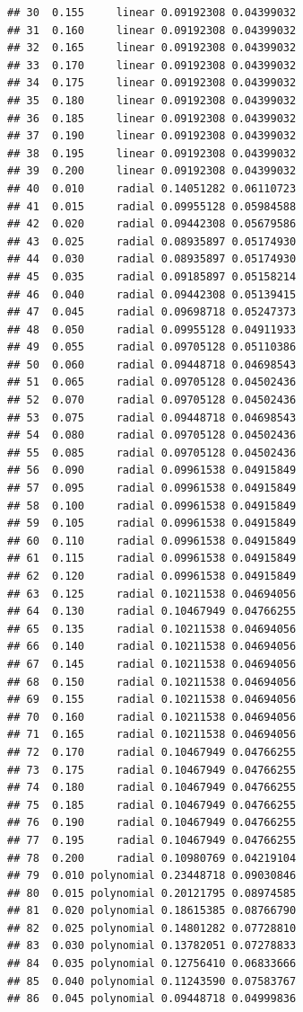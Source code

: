 \documentclass[12pt,fleqn]{article}\usepackage[]{graphicx}\usepackage[]{color}
\makeatletter
\newenvironment{kframe}{%
 \def\at@end@of@kframe{}%
 \ifinner\ifhmode%
  \def\at@end@of@kframe{\end{minipage}}%
  \begin{minipage}{\columnwidth}%
 \fi\fi%
 \def\FrameCommand##1{\hskip\@totalleftmargin \hskip-\fboxsep
 \colorbox{shadecolor}{##1}\hskip-\fboxsep
     \hskip-\linewidth \hskip-\@totalleftmargin \hskip\columnwidth}%
 \MakeFramed {\advance\hsize-\width
   \@totalleftmargin\z@ \linewidth\hsize
   \@setminipage}}%
 {\par\unskip\endMakeFramed%
 \at@end@of@kframe}
\newenvironment{knitrout}{}{} %
\theoremstyle{definition}
\makeatother
\begin{document}
\begin{enumerate}[1.]
\begin{enumerate}
\begin{knitrout}
\begin{kframe}
\begin{verbatim}
## 30  0.155     linear 0.09192308 0.04399032
## 31  0.160     linear 0.09192308 0.04399032
## 32  0.165     linear 0.09192308 0.04399032
## 33  0.170     linear 0.09192308 0.04399032
## 34  0.175     linear 0.09192308 0.04399032
## 35  0.180     linear 0.09192308 0.04399032
## 36  0.185     linear 0.09192308 0.04399032
## 37  0.190     linear 0.09192308 0.04399032
## 38  0.195     linear 0.09192308 0.04399032
## 39  0.200     linear 0.09192308 0.04399032
## 40  0.010     radial 0.14051282 0.06110723
## 41  0.015     radial 0.09955128 0.05984588
## 42  0.020     radial 0.09442308 0.05679586
## 43  0.025     radial 0.08935897 0.05174930
## 44  0.030     radial 0.08935897 0.05174930
## 45  0.035     radial 0.09185897 0.05158214
## 46  0.040     radial 0.09442308 0.05139415
## 47  0.045     radial 0.09698718 0.05247373
## 48  0.050     radial 0.09955128 0.04911933
## 49  0.055     radial 0.09705128 0.05110386
## 50  0.060     radial 0.09448718 0.04698543
## 51  0.065     radial 0.09705128 0.04502436
## 52  0.070     radial 0.09705128 0.04502436
## 53  0.075     radial 0.09448718 0.04698543
## 54  0.080     radial 0.09705128 0.04502436
## 55  0.085     radial 0.09705128 0.04502436
## 56  0.090     radial 0.09961538 0.04915849
## 57  0.095     radial 0.09961538 0.04915849
## 58  0.100     radial 0.09961538 0.04915849
## 59  0.105     radial 0.09961538 0.04915849
## 60  0.110     radial 0.09961538 0.04915849
## 61  0.115     radial 0.09961538 0.04915849
## 62  0.120     radial 0.09961538 0.04915849
## 63  0.125     radial 0.10211538 0.04694056
## 64  0.130     radial 0.10467949 0.04766255
## 65  0.135     radial 0.10211538 0.04694056
## 66  0.140     radial 0.10211538 0.04694056
## 67  0.145     radial 0.10211538 0.04694056
## 68  0.150     radial 0.10211538 0.04694056
## 69  0.155     radial 0.10211538 0.04694056
## 70  0.160     radial 0.10211538 0.04694056
## 71  0.165     radial 0.10211538 0.04694056
## 72  0.170     radial 0.10467949 0.04766255
## 73  0.175     radial 0.10467949 0.04766255
## 74  0.180     radial 0.10467949 0.04766255
## 75  0.185     radial 0.10467949 0.04766255
## 76  0.190     radial 0.10467949 0.04766255
## 77  0.195     radial 0.10467949 0.04766255
## 78  0.200     radial 0.10980769 0.04219104
## 79  0.010 polynomial 0.23448718 0.09030846
## 80  0.015 polynomial 0.20121795 0.08974585
## 81  0.020 polynomial 0.18615385 0.08766790
## 82  0.025 polynomial 0.14801282 0.07728810
## 83  0.030 polynomial 0.13782051 0.07278833
## 84  0.035 polynomial 0.12756410 0.06833666
## 85  0.040 polynomial 0.11243590 0.07583767
## 86  0.045 polynomial 0.09448718 0.04999836

\end{verbatim}
\end{kframe}
\end{knitrout}
\end{enumerate}
\end{enumerate}
\end{document}
